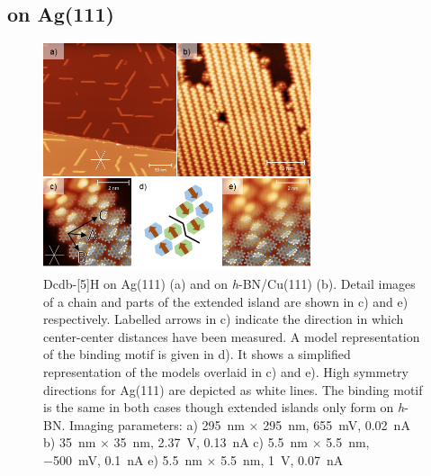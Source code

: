 \subsection{on Ag(111)}
\begin{figure} \centering
	\includegraphics[width=0.7\textwidth]{./images/paper/helicene/fig2}
	\caption{Dcdb-[5]H on Ag(111) (a) and on \textit{h}-BN/Cu(111) (b). Detail images of a chain and parts of the extended island are shown in c) and e) respectively. Labelled arrows in c) indicate the direction in which center-center distances have been measured. A model representation of the binding motif is given in d). It shows a simplified representation of the models overlaid in c) and e). High symmetry directions for Ag(111) are depicted as white lines. The binding motif is the same in both cases though extended islands only form on \textit{h}-BN. Imaging parameters: 
		a) %
		\SI{295}{\nano \meter} $\times$ \SI{295}{\nano \meter},
		\SI{655}{\milli \volt}, \SI{0.02}{\nano \ampere} 
		b) %
		\SI{35}{\nano \meter} $\times$ \SI{35}{\nano \meter},
		\SI{2.37}{\volt}, \SI{0.13}{\nano \ampere}
		c) %
		\SI{5.5}{\nano \meter} $\times$ \SI{5.5}{\nano \meter},
		\SI{-500}{\milli \volt}, \SI{0.1}{\nano \ampere}
		e) %
		\SI{5.5}{\nano \meter} $\times$ \SI{5.5}{\nano \meter},
		\SI{1}{\volt}, \SI{0.07}{\nano \ampere}
	}
	\label{fig:hel-fig2}
\end{figure}

